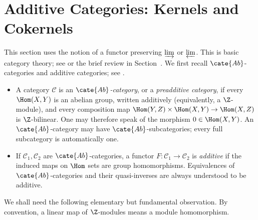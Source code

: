 
\section{Additive Categories: Kernels and Cokernels}\label{sec:Ker-Coker}
\hypertarget{o014.aljabr2.chapter1.additive-categories-kernels-cokernels}{ }

This section uses the notion of a functor preserving $\varinjlim$ or $\varprojlim$. This is basic category theory; see \cite[Definition~2.8.8]{Li1} or the brief review in Section~. We first recall $\cate{Ab}$-categories and additive categories; see \cite[\S~3.4]{Li1}.

\begin{itemize}
	\item A category $\mathcal C$ is an \emph{$\cate{Ab}$-category}, or a \emph{preadditive category}, if every $\Hom(X,Y)$ is an abelian group, written additively (equivalently, a $\Z$-module), and every composition map $\Hom(Y,Z)\times\Hom(X,Y)\to\Hom(X,Z)$ is $\Z$-bilinear. One may therefore speak of the morphism $0\in\Hom(X,Y)$. An $\cate{Ab}$-category may have $\cate{Ab}$-subcategories; every full subcategory is automatically one.

	\item If $\mathcal C_1,\mathcal C_2$ are $\cate{Ab}$-categories, a functor $F:\mathcal C_1\to\mathcal C_2$ is \emph{additive} if the induced maps on $\Hom$ sets are group homomorphisms. Equivalences of $\cate{Ab}$-categories and their quasi-inverses are always understood to be additive.
\end{itemize}

We shall need the following elementary but fundamental observation. By convention, a linear map of $\Z$-modules means a module homomorphism.

